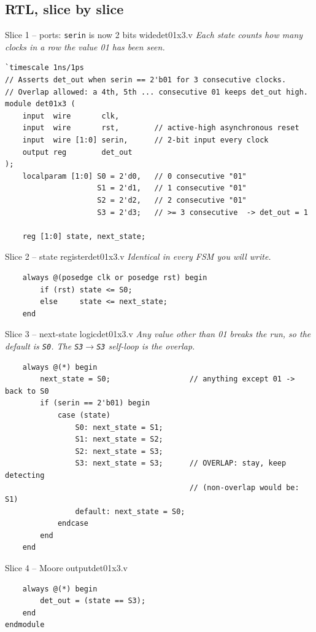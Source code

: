 \documentclass[10pt,a4paper]{article}
\newcommand{\slicenote}[1]{{\small\color{black!70}\itshape #1}\par\smallskip}
\begin{document}
\subsection{RTL, slice by slice}
\begin{codeslice}{Slice 1 -- ports: \texttt{serin} is now 2 bits wide}{det01x3.v}
\slicenote{Each state counts how many clocks in a row the value 01 has been seen.}
\begin{lstlisting}
`timescale 1ns/1ps
// Asserts det_out when serin == 2'b01 for 3 consecutive clocks.
// Overlap allowed: a 4th, 5th ... consecutive 01 keeps det_out high.
module det01x3 (
    input  wire       clk,
    input  wire       rst,        // active-high asynchronous reset
    input  wire [1:0] serin,      // 2-bit input every clock
    output reg        det_out
);
    localparam [1:0] S0 = 2'd0,   // 0 consecutive "01"
                     S1 = 2'd1,   // 1 consecutive "01"
                     S2 = 2'd2,   // 2 consecutive "01"
                     S3 = 2'd3;   // >= 3 consecutive  -> det_out = 1

    reg [1:0] state, next_state;
\end{lstlisting}
\end{codeslice}
\begin{codeslice}{Slice 2 -- state register}{det01x3.v}
\slicenote{Identical in every FSM you will write.}
\begin{lstlisting}
    always @(posedge clk or posedge rst) begin
        if (rst) state <= S0;
        else     state <= next_state;
    end
\end{lstlisting}
\end{codeslice}
\begin{codeslice}{Slice 3 -- next-state logic}{det01x3.v}
\slicenote{Any value other than 01 breaks the run, so the default is \texttt{S0}. The \texttt{S3}$\to$\texttt{S3} self-loop is the overlap.}
\begin{lstlisting}
    always @(*) begin
        next_state = S0;                  // anything except 01 -> back to S0
        if (serin == 2'b01) begin
            case (state)
                S0: next_state = S1;
                S1: next_state = S2;
                S2: next_state = S3;
                S3: next_state = S3;      // OVERLAP: stay, keep detecting
                                          // (non-overlap would be: S1)
                default: next_state = S0;
            endcase
        end
    end
\end{lstlisting}
\end{codeslice}
\begin{codeslice}{Slice 4 -- Moore output}{det01x3.v}
\begin{lstlisting}
    always @(*) begin
        det_out = (state == S3);
    end
endmodule
\end{lstlisting}
\end{codeslice}
\end{document}
